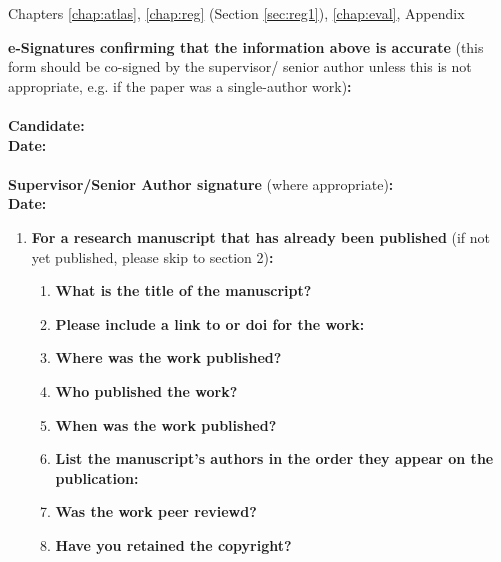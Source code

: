 {\begin{enumerate}[leftmargin=*,label={\bfseries\arabic*.}]
Chapters \ref{chap:atlas}, \ref{chap:reg} (Section \ref{sec:reg1}), \ref{chap:eval}, Appendix
\end{enumerate}

\textbf{e-Signatures confirming that the information above is accurate}
(this form should be co-signed by the supervisor/ senior author unless this is not appropriate, e.g. if the paper was a single-author work)\textbf{:}\\
\textbf{}\\
\textbf{Candidate:}\\
\textbf{Date:}\\
\textbf{}\\
\textbf{Supervisor/Senior Author signature} (where appropriate)\textbf{:}\\
\textbf{Date:}
%

\newpage
\begin{enumerate}[leftmargin=*,label={\bfseries\arabic*.}]\itemsep0em
	\item \textbf{For a research manuscript that has already been published} (if not yet published, please skip to section 2)\textbf{:}
	\begin{enumerate}[label={\alph*)}]\itemsep0em
	\item \textbf{What is the title of the manuscript?}

	\item \textbf{Please include a link to or doi for the work:}

	\item \textbf{Where was the work published?}

	\item \textbf{Who published the work?}

	\item \textbf{When was the work published?}

	\item \textbf{List the manuscript's authors in the order they appear on the publication:}

	\item \textbf{Was the work peer reviewd?}

	\item \textbf{Have you retained the copyright?}


\end{enumerate}
\end{enumerate}}

